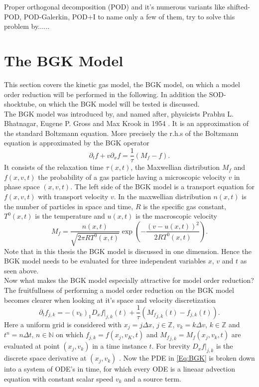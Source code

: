 \documentclass[12pt, a4paper]{article}
\begin{document}
Proper orthogonal decomposition (POD) and it's numerous variants like shifted-POD\cite{bibid}, POD-Galerkin\cite{bibid}, POD+I \cite{bibid} to name only a few of them, try to solve this problem by......	
\section{The BGK Model}\label{Sec: BGK}
This section covers the kinetic gas model, the BGK model, on which a model order reduction will be performed in the following. In addition the SOD-shocktube, on which the BGK model will be tested is discussed.\\
The BGK model was introduced by, and named after, physicists Prabhu L. Bhatnagar, Eugene P. Gross and Max Krook in 1954 \cite{BGK}. It is an approximation of the standard Boltzmann equation. More precisely the r.h.s of the Boltzmann equation is approximated by the BGK operator \cite{puppo2019kinetic}
\begin{equation}
\partial_t f + v \partial_x f = \frac{1}{\tau} (M_f - f) \text{.}
\label{Eq:BGK}
\end{equation}
It consists of the relaxation time \(\tau(x,t)\), the Maxwellian distribution \(M_f\) and \(f(x,v,t)\) the probability of a gas particle having a microscopic velocity \(v\) in phase space \((x,v,t)\). The left side of the BGK model is a transport equation for \(f(x,v,t)\) with transport velocity \(v\). In the maxwellian distribution \(n(x,t)\) is the number of particles in space and time, \(R\) is the specific gas constant, \(T^0(x,t)\) is the temperature and \(u(x,t)\) is the macroscopic velocity
\begin{equation}
M_f = \frac{n(x,t)}{\sqrt{2\pi R T^0(x,t)}}\exp(-\frac{(v - u(x,t))^2}{2 R T^0(x,t)}) \text{.}
\end{equation}
Note that in this thesis the BGK model is discussed in one dimension. Hence the BGK model needs to be evaluated for three independent variables \(x\), \(v\) and \(t\) as seen above.\\ 
Now what makes the BGK model especially attractive for model order reduction?
The fruitfullness of performing a model order reduction on the BGK model becomes clearer when looking at it's space and velocity discretization
\begin{equation}
	\partial_t f_{j,k} = -(v_k)_1D_x f|_{j,k}(t) + \frac{1}{\tau}({M_f}_{j,k}(t) - f_{j,k}(t)) \text{.}
	\label{Eq:Discrete BGK}
\end{equation}
Here a uniform grid is considered with \(x_j = j\Delta x\), \(j \in \mathbb{Z}\), \(v_k = k\Delta v\), \(k \in \mathbb{Z}\) and \(t^n = n \Delta t\), \(n \in \mathbb{N}\) on which \(f_{j,k} = f(x_j,v_K,t)\) and \({M_f}_{j,k} = M_f(x_j,v_k,t)\) are evaluated at point \((x_j,v_k)\) in a time instance \(t\). For brevity \(D_x f|_{j,k}\) is the discrete space derivative at \((x_j,v_k)\) \cite{puppo2019kinetic}. Now the PDE in \cref{Eq:BGK} is broken down into a system of ODE's in time, for which every ODE is a lineaar advection equation with constant scalar speed \(v_k\) and a source term.\\ 
\end{document}
